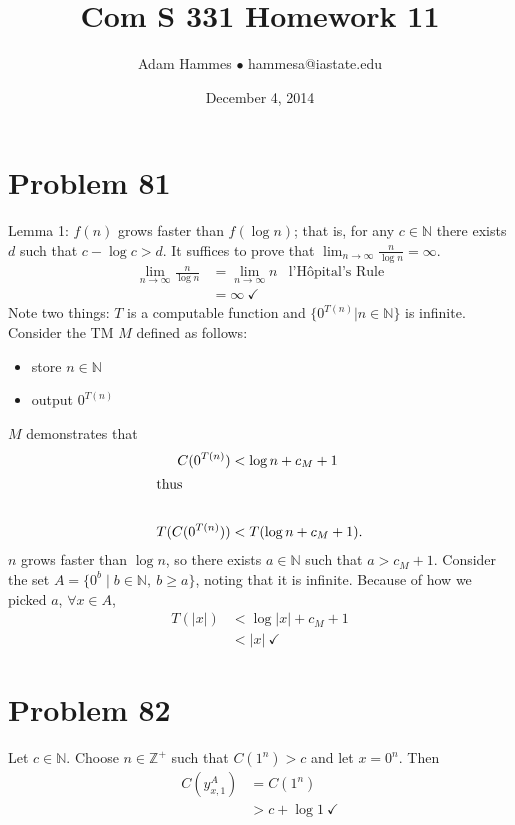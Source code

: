 \documentclass[11pt]{article}
\let\imp\rightarrow
\begin{document}
\title{Com S 331 Homework 11}
\author{Adam Hammes $\bullet$ hammesa@iastate.edu}
\date{December 4, 2014}
\maketitle


\section*{Problem 81}

Lemma 1: $f(n)$ grows faster than $f( \log n)$; that is, for any $c \in \mathbb{N}$ there exists $d$ such that $c - \log c > d$. 
It suffices to prove that $\lim _{n \imp \infty} \frac{n}{\log n}= \infty$.
	\begin{align*}
		\lim _{n \imp \infty} \frac{n}{\log n}  &= \lim _{n \imp \infty} n &\text{l'H\^{o}pital's Rule} \\
		&= \infty \ \checkmark
	\end{align*}
Note two things: $T$ is a computable function and $\{ 0^{T(n)} | n \in \mathbb{N} \}$ is infinite.
Consider the TM $M$ defined as follows:
	\begin{itemize}
		\item store $n \in \mathbb{N}$
		\item output $0^{T(n)}$
	\end{itemize}
$M$ demonstrates that
	\begin{align*}
		C( 0^{T(n)} ) &< \log n + c_M + 1 \\
		\intertext{thus} \\
		T( C( 0^{T(n)}) ) &< T( \log n + c_M +1 ).
	\end{align*}
$n$ grows faster than $\log n$, so there exists $a \in \mathbb{N}$ such that $a > c_M + 1$.
Consider the set $A = \{ 0^b \mid b \in \mathbb{N},\ b \geq a \}$, noting that it is infinite.
Because of how we picked $a$, $\forall x \in A$,
	\begin{align*}
		T(|x|) &< \log |x| + c_M + 1 \\
		&< |x| \ \checkmark
	\end{align*}


\section*{Problem 82}

Let $c \in \mathbb{N}$. Choose $n \in \mathbb{Z}^+$ such that $C(1^n) > c$ and let $x = 0^n$.
Then
	\begin{align*}
		C(y_{x,1} ^A) &= C(1^n) \\
		&> c + \log 1 \ \checkmark
	\end{align*}
\end{document}
